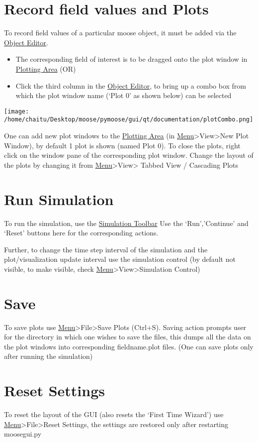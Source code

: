 \documentclass[11pt]{article}
\begin{document}
      
\section{Record field values and Plots}
\label{sec-4}

  
  To record field values of a particular moose object, it must be added via the \hyperref[sec-2]{Object Editor}. 
\begin{itemize}
\item The corresponding field of interest is to be dragged onto the plot window in \hyperref[sec-2]{Plotting Area} (OR)
\item Click the third column in the \hyperref[sec-2]{Object Editor}, to bring up a combo box from which the plot window name (`Plot 0' as shown below) can be selected
\end{itemize}
  \texttt{[image: /home/chaitu/Desktop/moose/pymoose/gui/qt/documentation/plotCombo.png]}
 
  One can add new plot windows to the \hyperref[sec-1]{Plotting Area} (in \hyperref[sec-2]{Menu}>View>New Plot Window), by default 1 plot is shown (named Plot 0). 
  To close the plots, right click on the window pane of the corresponding plot window. 
  Change the layout of the plots by changing it from \hyperref[sec-2]{Menu}>View> Tabbed View / Cascading Plots

\section{Run Simulation}
\label{sec-5}

  
  To run the simulation, use the \hyperref[sec-2]{Simulation Toolbar} Use the `Run','Continue' and `Reset' buttons here for the corresponding actions.
  
  Further, to change the time step interval of the simulation and the plot/visualization update interval use the simulation control (by default not visible, to make visible, check \hyperref[sec-2]{Menu}>View>Simulation Control)

\section{Save}
\label{sec-6}


  To save plots use \hyperref[sec-2]{Menu}>File>Save Plots (Ctrl+S). Saving action prompts user for the directory in which one wishes to save the files, this dumps all the data on the plot windows into corresponding fieldname.plot files. (One can save plots only after running the simulation)

\section{Reset Settings}
\label{sec-7}


  To reset the layout of the GUI (also resets the `First Time Wizard') use \hyperref[sec-2]{Menu}>File>Reset Settings, the settings are restored only after restarting moosegui.py
\end{document}

